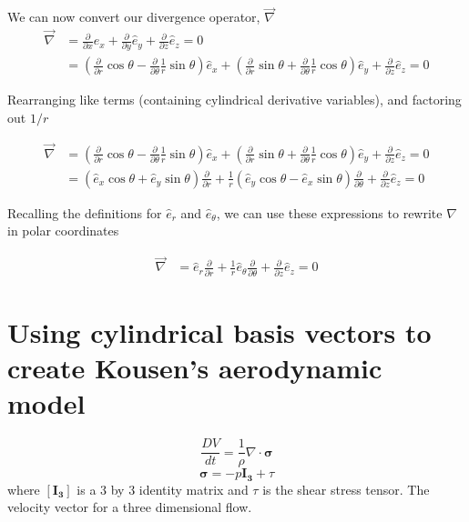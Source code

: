 We can now convert our divergence operator, $\vec{\nabla}$ 
\begin{align*}
	\vec{\nabla} &=
	\frac{\partial }{\partial x} \hat{e}_x +
	\frac{\partial }{\partial y} \hat{e}_y +
	\frac{\partial }{\partial z} \hat{e}_z = 0 \\
	&=
	\left(
	\frac{\partial}{\partial r} \cos \theta -
	\frac{\partial}{\partial \theta} \frac{1}{r} \sin \theta \right)\hat{e}_x +
	\left(
	\frac{\partial} {\partial r} \sin \theta +
	\frac{\partial} {\partial \theta} \frac{1}{r} \cos \theta \right)\hat{e}_y +
	\frac{\partial }{\partial z} \hat{e}_z                        = 0
\end{align*}

Rearranging like terms (containing cylindrical derivative variables), and factoring out $1/r$

\begin{align*}
	\vec{\nabla} &=
	\left(
	\frac{\partial} {\partial r} \cos \theta -
	\frac{\partial} {\partial \theta} \frac{1}{r} \sin \theta
	\right)\hat{e}_x +
	\left(
	\frac{\partial} {\partial r} \sin \theta +
	\frac{\partial} {\partial \theta} \frac{1}{r}\cos  \theta
	\right) \hat{e}_y +
	\frac{\partial }{\partial z} \hat{e}_z = 0 \\
	&= \left(
	\hat{e}_x \cos \theta +
	\hat{e}_y \sin \theta
	\right)
	\frac{\partial} {\partial r} +
	\frac{1}{r}\left(
	\hat{e}_y  \cos \theta -
	\hat{e}_x \sin \theta
	\right)
	\frac{\partial} {\partial \theta} +
	\frac{\partial }{\partial z} \hat{e}_z = 0
\end{align*}

Recalling the definitions for $\hat{e}_r$ and $\hat{e}_{\theta}$, we can use these expressions to rewrite $\nabla$ in polar coordinates

\begin{align*}
	\vec{\nabla} 
	&= \hat{e}_r \frac{\partial} {\partial r} + 
	\frac{1}{r} \hat{e}_{\theta}   
	\frac{\partial} {\partial \theta} + 
	\frac{\partial }{\partial z} \hat{e}_z = 0
\end{align*}
\newpage
\newpage


\section{Using cylindrical basis vectors to create Kousen's aerodynamic model}


\[\frac{DV}{dt}                                               = \frac{1}{\rho} \nabla \cdot \boldsymbol{\sigma}\]
\[\boldsymbol{\sigma}                                         = -p\boldsymbol{I_3}+ \tau\]
where $\boldsymbol{[I_3]}$ is a 3 by 3 identity matrix and $\tau$ is the shear stress tensor. The velocity vector for a three dimensional flow.

